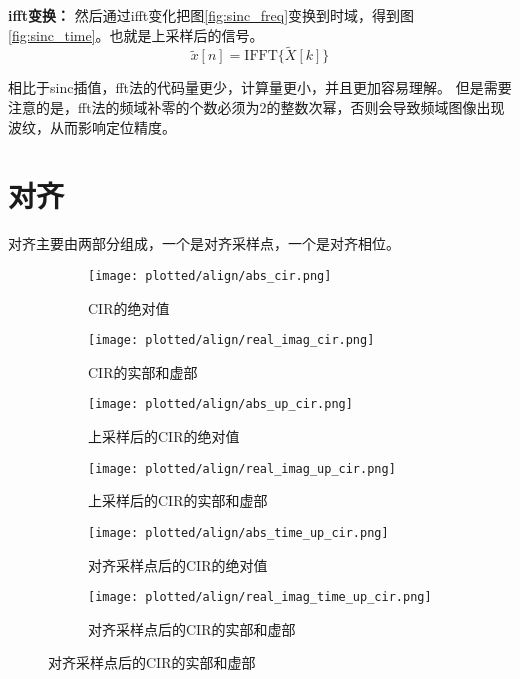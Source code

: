 \textbf{ifft变换：}
然后通过ifft变化把图\ref{fig:sinc_freq}变换到时域，得到图\ref{fig:sinc_time}。也就是上采样后的信号。
\[ \tilde{x}[n] = \text{IFFT}\{ \tilde{X}[k] \} \]

相比于sinc插值，fft法的代码量更少，计算量更小，并且更加容易理解。
但是需要注意的是，fft法的频域补零的个数必须为2的整数次幂，否则会导致频域图像出现波纹，从而影响定位精度。

\section{对齐}
对齐主要由两部分组成，一个是对齐采样点，一个是对齐相位。
\begin{figure}[htbp]
    \centering
    \begin{subfigure}{0.47\textwidth}
        \centering
        \texttt{[image: plotted/align/abs\_cir.png]}
        \caption{\label{fig:abs_cir}CIR的绝对值}
    \end{subfigure}%
    \begin{subfigure}{0.47\textwidth}
        \centering
        \texttt{[image: plotted/align/real\_imag\_cir.png]}
        \caption{\label{fig:real_imag_cir}CIR的实部和虚部}
    \end{subfigure}

    \begin{subfigure}{0.47\textwidth}
        \centering
        \texttt{[image: plotted/align/abs\_up\_cir.png]}
        \caption{\label{fig:abs_up_cir}上采样后的CIR的绝对值}
    \end{subfigure}
    \begin{subfigure}{0.47\textwidth}
        \centering
        \texttt{[image: plotted/align/real\_imag\_up\_cir.png]}
        \caption{\label{fig:real_imag_up_cir}上采样后的CIR的实部和虚部}
    \end{subfigure}%

    \begin{subfigure}{0.47\textwidth}
        \centering
        \texttt{[image: plotted/align/abs\_time\_up\_cir.png]}
        \caption{\label{fig:abs_time_up_cir}对齐采样点后的CIR的绝对值}
    \end{subfigure}
    \begin{subfigure}{0.47\textwidth}
        \centering
        \texttt{[image: plotted/align/real\_imag\_time\_up\_cir.png]}
        \caption{\label{fig:real_imag_time_up_cir}对齐采样点后的CIR的实部和虚部}
    \end{subfigure}


\end{figure}
